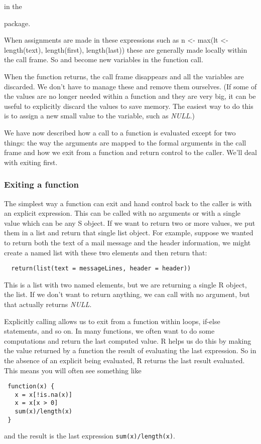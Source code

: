 in the { package.

When assignments are made in these expressions such as n
\textless{}- max(lt \textless{}- length(text), length(first),
length(last)) these are generally made locally within the call
frame. So  and  become new variables in
the function call.

When the function returns, the call frame disappears and all the
variables are discarded. We don't have to manage these and remove them
ourselves. (If some of the values are no longer needed within a
function and they are very big, it can be useful to explicitly discard
the values to save memory. The easiest way to do this is to assign a
new small value to the variable, such as \textsl{NULL}.)

We have now described how a call to a function is evaluated except
for two things: the way the arguments are mapped to the formal
arguments in the call frame and how we exit from a function and return
control to the caller. We'll deal with exiting first. 

\subsubsection{Exiting a function}
The simplest way a function can exit and hand control back to the
caller is with an explicit  expression. This can be
called with no arguments or with a single value which can be any S
object. If we want to return two or more values, we put them in a list
and return that single list object. For example, suppose we wanted to
return both the text of a mail message and the header information, we
might create a named list with these two elements and then return
that:
\begin{verbatim}
  return(list(text = messageLines, header = header))
\end{verbatim}
This is a list with two named elements, but we are returning a single
R object, the list. If we don't want to return anything, we can call
 with no argument, but that actually returns
\textsl{NULL}.

Explicitly calling  allows us to exit from a function
within loops, if-else statements, and so on. In many functions, we
often want to do some computations and return the last computed
value. R helps us do this by making the value returned by a function
the result of evaluating the last expression. So in the absence of an
explicit  being evaluated, R returns the last result
evaluated. This means you will often see something like
\begin{verbatim}
 function(x) {
   x = x[!is.na(x)]
   x = x[x > 0]
   sum(x)/length(x)
 }
\end{verbatim}
and the result is the last expression \verb|sum(x)/length(x)|. 

}

